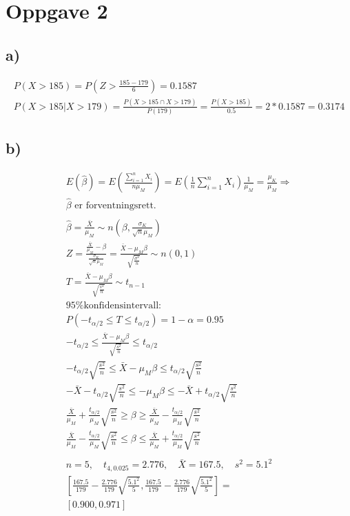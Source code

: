 \section*{Oppgave 2}

\subsection*{a)}

\begin{gather*}
	P(X > 185) = P\left(Z > \frac{185 - 179}{6}\right) = 0.1587
	\\
	P(X > 185 | X > 179) = \frac{P(X > 185 \cap X > 179)}{P(179)} = \frac{P(X > 185)}{0.5} = 2 * 0.1587 = 0.3174
\end{gather*}


\subsection*{b)}

\begin{gather*}
	E(\hat \beta) = E\left(\frac{\sum_{i = 1}^{n}{X_i}}{n \mu_M}\right) = E\left(\frac{1}{n}\sum_{i = 1}^{n}{X_i}\right) \frac{1}{\mu_M} = \frac{\mu_K}{\mu_M}
	\Rightarrow
	\\
	\hat \beta \text{ er forventningsrett.}
	\\
	\\
	\hat \beta = \frac{\bar X}{\mu_M} \sim n\left(\beta, \frac{\sigma_K}{\sqrt{n} \mu_M}\right)
	\\
	Z = \frac{\frac{\bar X}{\mu_M} - \beta}{\frac{\sigma_K}{\sqrt{n} \mu_M}}
	=
	\frac{\bar X - \mu_M \beta}{\sqrt{\frac{\sigma^2}{n}}} \sim n(0, 1)
	\\
	T = \frac{\bar X - \mu_M \beta}{\sqrt{\frac{s^2}{n}}} \sim t_{n - 1}
	\\
	\text{95\% konfidensintervall:}
	\\
	P(-t_{\alpha / 2} \leq T \leq t_{\alpha / 2}) = 1 - \alpha = 0.95
	\\
	-t_{\alpha / 2} \leq \frac{\bar X - \mu_M \beta}{\sqrt{\frac{s^2}{n}}} \leq t_{\alpha / 2}
	\\
	-t_{\alpha / 2} \sqrt{\frac{s^2}{n}} \leq \bar X - \mu_M \beta \leq t_{\alpha / 2} \sqrt{\frac{s^2}{n}}
	\\
	- \bar X - t_{\alpha / 2} \sqrt{\frac{s^2}{n}} \leq - \mu_M \beta \leq - \bar X + t_{\alpha / 2} \sqrt{\frac{s^2}{n}}
	\\
	\frac{\bar X}{\mu_M} + \frac{t_{\alpha / 2}}{\mu_M} \sqrt{\frac{s^2}{n}} \geq \beta \geq \frac{\bar X}{\mu_M} - \frac{t_{\alpha / 2}}{\mu_M} \sqrt{\frac{s^2}{n}}
	\\
	\frac{\bar X}{\mu_M} - \frac{t_{\alpha / 2}}{\mu_M} \sqrt{\frac{s^2}{n}} \leq \beta \leq \frac{\bar X}{\mu_M} + \frac{t_{\alpha / 2}}{\mu_M} \sqrt{\frac{s^2}{n}}
	\\
	\\
	n = 5, \quad t_{4, 0.025} = 2.776, \quad \bar X = 167.5, \quad s^2 = 5.1^2
	\\
	\left[\frac{167.5}{179} - \frac{2.776}{179} \sqrt{\frac{5.1^2}{5}}, \frac{167.5}{179} - \frac{2.776}{179} \sqrt{\frac{5.1^2}{5}}\right]
	=
	\\
	\left[0.900, 0.971\right]
\end{gather*}



